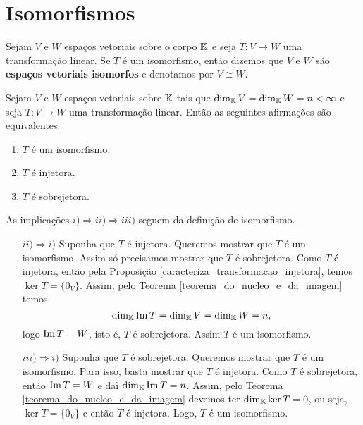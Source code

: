\section{Isomorfismos}

\begin{definicao}
	Sejam $V$ e $W$ espa\c{c}os vetoriais sobre o corpo $\mathbb{K}$ e seja $T : V \to W$ uma transforma\c{c}\~ao linear. Se $T$ \'e um isomorfismo, ent\~ao dizemos que $V$ e $W$ s\~ao \textbf{espa\c{c}os vetoriais isomorfos} e denotamos por $V \cong W$.
\end{definicao}

\begin{proposicao}\label{equivalencia_isomorfismo_dimensao_finita}
	Sejam $V$ e $W$ espa\c{c}os vetoriais sobre $\mathbb{K}$ tais que $\dim_{\mathbb{K}}V = \dim_{\mathbb{K}}W = n < \infty$ e seja $T : V \to W$ uma transforma\c{c}\~ao linear. Ent\~ao as seguintes afirma\c{c}\~oes s\~ao equivalentes:
	\begin{enumerate}[label={\roman*})]
		\item $T$ \'e um isomorfismo.
		\item $T$ \'e injetora.
		\item $T$ \'e sobrejetora.
	\end{enumerate}
\end{proposicao}
\begin{prova}
	As implica\c{c}\~oes $i) \Rightarrow ii) \Rightarrow iii)$ seguem da defini\c{c}\~ao de isomorfismo.
	\begin{enumerate}
		\item[$ii) \Rightarrow i)$] Suponha que $T$ \'e injetora. Queremos mostrar que $T$ \'e um isomorfismo. Assim s\'o precisamos mostrar que $T$ \'e sobrejetora. Como $T$ \'e injetora, ent\~ao pela Proposi\c{c}\~ao \ref{caracteriza_transformacao_injetora}, temos $\ker T = \{0_V\}$. Assim, pelo Teorema \ref{teorema_do_nucleo_e_da_imagem} temos
		\[
			\dim_{\mathbb{K}}{\rm Im\,} T = \dim_{\mathbb{K}}V = \dim_{\mathbb{K}}W = n,
		\]
		logo ${\rm Im\,} T = W$, isto \'e, $T$ \'e sobrejetora. Assim $T$ \'e um isomorfismo.

		\item[$iii) \Rightarrow i)$] Suponha que $T$ \'e sobrejetora. Queremos mostrar que $T$ \'e um isomorfismo. Para isso, basta mostrar que $T$ \'e injetora. Como $T$ \'e sobrejetora, ent\~ao ${\rm Im\,} T = W$ e da{\'\i} $\dim_{\mathbb{K}}{\rm Im\,} T = n$. Assim, pelo Teorema \ref{teorema_do_nucleo_e_da_imagem} devemos ter $\dim_{\mathbb{K}}\ker T = 0$, ou seja, $\ker T = \{0_V\}$ e ent\~ao $T$ \'e injetora. Logo, $T$ \'e um isomorfismo.
	\end{enumerate}
\end{prova}

